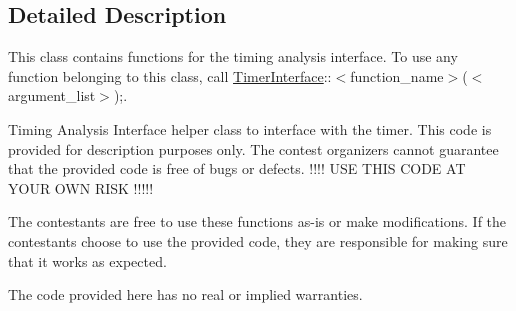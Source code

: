 \subsection{Detailed Description}
This class contains functions for the timing analysis interface. To use any function belonging to this class, call \hyperlink{classTimerInterface}{Timer\-Interface}\-:\-:$<$function\-\_\-name$>$($<$argument\-\_\-list$>$);. 

Timing Analysis Interface helper class to interface with the timer. This code is provided for description purposes only. The contest organizers cannot guarantee that the provided code is free of bugs or defects. !!!! U\-S\-E T\-H\-I\-S C\-O\-D\-E A\-T Y\-O\-U\-R O\-W\-N R\-I\-S\-K !!!!!

The contestants are free to use these functions as-\/is or make modifications. If the contestants choose to use the provided code, they are responsible for making sure that it works as expected.

The code provided here has no real or implied warranties. 

